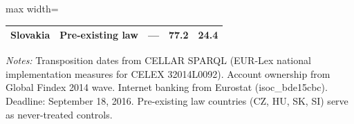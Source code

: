 \begin{table}[htbp]
\begin{adjustbox}{max width=\textwidth}
\begin{tabular}{llccc}
Slovakia & Pre-existing law & --- & 77.2 & 24.4 \\
\hline\hline
\end{tabular}
\end{adjustbox}
\begin{tablenotes}
\item \textit{Notes:} Transposition dates from CELLAR SPARQL (EUR-Lex national implementation measures for CELEX 32014L0092). Account ownership from Global Findex 2014 wave. Internet banking from Eurostat (isoc\_bde15cbc). Deadline: September 18, 2016. Pre-existing law countries (CZ, HU, SK, SI) serve as never-treated controls.
\end{tablenotes}
\end{table}
